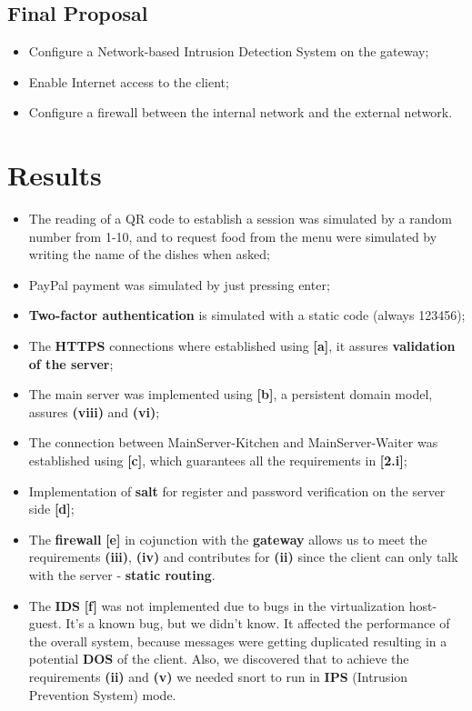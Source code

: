 \documentclass[12pt,paper=a4]{article}
\begin{document}
\subsection{Final Proposal}
\begin{itemize}
\item[\ding{51}] Configure a Network-based Intrusion Detection System on the gateway;
\item[\ding{51}] Enable Internet access to the client;
\item[\ding{51}] Configure a firewall between the internal network and the external network.
\end{itemize}

\section{Results}
\begin{itemize}
\item The reading of a QR code to establish a session was simulated by a random number from 1-10, and to request food from the menu were simulated by writing the name of the dishes when asked;
\item PayPal payment was simulated by just pressing enter;
\item \textbf{Two-factor authentication} is simulated with a static code (always 123456);
\item The \textbf{HTTPS} connections where established using \textbf{[a]}, it assures \textbf{validation of the server};
\item The main server was implemented using \textbf{[b]}, a persistent domain model, assures \textbf{(viii)} and \textbf{(vi)};
\item The connection between MainServer-Kitchen and MainServer-Waiter was established using \textbf{[c]}, which guarantees all the requirements in \textbf{[2.i]};
\item Implementation of \textbf{salt} for register and password verification on the server side \textbf{[d]};
\item The \textbf{firewall} \textbf{[e]} in cojunction with the \textbf{gateway} allows us to meet the requirements \textbf{(iii)}, \textbf{(iv)} and contributes for \textbf{(ii)} since the client can only talk with the server - \textbf{static routing}.
\item The \textbf{IDS} \textbf{[f]} was not implemented due to bugs in the virtualization host-guest. It's a known bug, but we didn't know. It affected the performance of the overall system, because messages were getting duplicated resulting in a potential \textbf{DOS} of the client. Also, we discovered that to achieve the requirements \textbf{(ii)} and \textbf{(v)} we needed snort to run in \textbf{IPS} (Intrusion Prevention System) mode.
\end{itemize}
\end{document}
